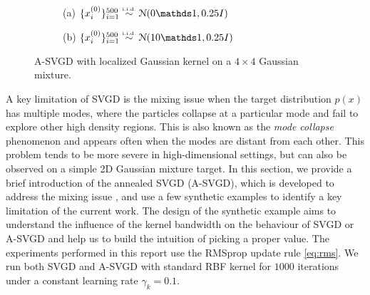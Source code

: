 \captionsetup[subfigure]{labelformat=empty}
\begin{figure}[t!]
    \centering 
\begin{subfigure}[b]{.48\textwidth} 
    \caption{(a) $\{x_i^{(0)}\}_{i = 1}^{500} \distiid \distNorm(0\ind, 0.25I)$  \label{fig:bwlocal}}
\end{subfigure}
\hfill
\centering
\begin{subfigure}[b]{0.48\textwidth}
    \caption{(b) $\{x_i^{(0)}\}_{i = 1}^{500} \distiid \distNorm(10\ind, 0.25I)$ \label{fig:slicelocal}}
\end{subfigure}

\caption{A-SVGD with localized Gaussian kernel on a $4 \times 4$ Gaussian mixture.}
\label{fig:gridlocal}
\end{figure}

A key limitation of SVGD is the mixing issue when the target
distribution $p(x)$ has multiple modes, where the
particles collapse at a particular mode and fail
to explore other high density regions. This is also known
as the \emph{mode collapse} phenomenon \citep{zhuo2018message,d2021annealed}
and appears often when the modes are distant from each other. This problem tends to be more severe in high-dimensional settings, but can
also be observed on a simple 2D Gaussian mixture target. 
In this section, we provide a brief introduction of the annealed SVGD
(A-SVGD), which is developed to address the mixing issue
\citep{d2021annealed}, and use a few synthetic examples to identify a key
limitation of the current work. The design of the synthetic example aims to
understand the influence of the kernel bandwidth on the behaviour of SVGD or
A-SVGD and help us to build the intuition of picking a proper value. The
experiments performed in this report use the RMSprop update rule
\cref{eq:rms}. We run both SVGD and A-SVGD with standard RBF kernel for
$1000$ iterations under a constant learning rate $\gamma_k = 0.1$.



